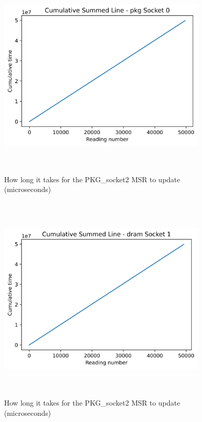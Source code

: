 \begin{figure}[H]
    \centering
    \includegraphics[width=10cm,height=10cm,keepaspectratio]{jmh/msr-update-rate/pkg_Socket_0-cumulative-summed.png}
    \caption{How long it takes for the PKG\_socket2 MSR to update (microseconds)}
    \label{fig:PKG-rapl-counter}
\end{figure}

\begin{figure}[H]
    \centering
    \includegraphics[width=10cm,height=10cm,keepaspectratio]{jmh/msr-update-rate/dram_Socket_1-cumulative-summed.png}
    \caption{How long it takes for the PKG\_socket2 MSR to update (microseconds)}
    \label{fig:PKG-rapl-counter}
\end{figure}

